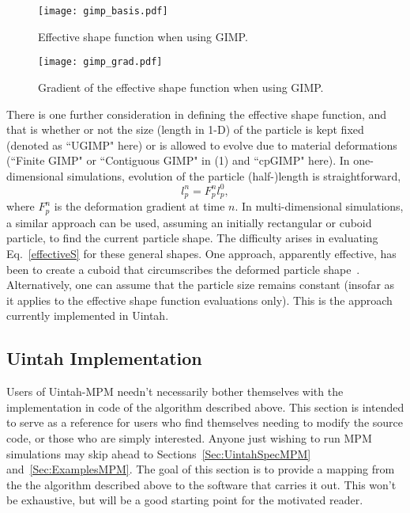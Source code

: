 \begin{figure}
  \texttt{[image: gimp\_basis.pdf]}
  \caption{Effective shape function when using GIMP.}
  \label{Fig:GIMP}
\end{figure}

\begin{figure}
  \texttt{[image: gimp\_grad.pdf]}
  \caption{Gradient of the effective shape function when using GIMP.}
  \label{Fig:GradGIMP}
\end{figure}
%
There is one further consideration in defining the effective shape function,
and that is whether or not the size (length in 1-D) of the particle is kept
fixed (denoted as ``UGIMP" here)
or is allowed to evolve due to material deformations 
(``Finite GIMP" or ``Contiguous GIMP" in (1) and ``cpGIMP" here).
In one-dimensional
simulations, evolution of the particle (half-)length is straightforward,
\begin{equation}
l_p^n = F_p^n l_p^0 ,  \label{particle_length}
\end{equation} 
where $F_p^n$ is the deformation gradient at time $n$.
In multi-dimensional simulations, a similar approach can be used, assuming
an initially rectangular or cuboid particle, to find the current particle
shape.  The difficulty arises in evaluating Eq.~\ref{effectiveS} for
these general shapes.  One approach, apparently effective, has been to create
a cuboid that circumscribes the deformed particle shape~\cite{jinmaCMES2006}.
Alternatively, one can assume that the particle size remains constant (insofar
as it applies to the effective shape function evaluations only).  This is
the approach currently implemented in Uintah.

\subsection{Uintah Implementation} \label{Sec:UintahImp}

Users of Uintah-MPM needn't necessarily bother themselves with the
implementation in code of the algorithm described above.  This section
is intended to serve as a reference for users who find themselves needing
to modify the source code, or those who are simply interested.  Anyone
just wishing to run MPM simulations may skip ahead to
Sections~\ref{Sec:UintahSpecMPM} and~\ref{Sec:ExamplesMPM}.  The goal of
this section is to provide a mapping from the the algorithm described above
to the software that carries it out.  This won't be exhaustive, but will be a
good starting point for the motivated reader.


